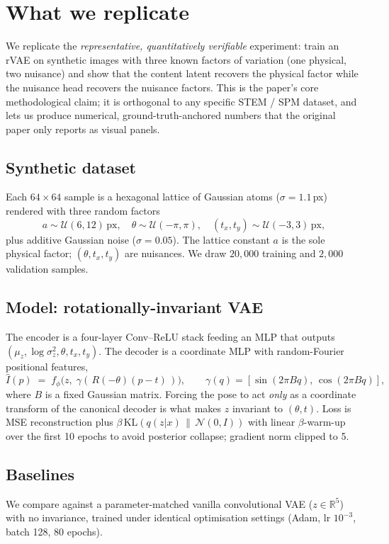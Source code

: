 \documentclass[11pt]{article}
\begin{document}
\section{What we replicate}
We replicate the \emph{representative, quantitatively verifiable}
experiment: train an rVAE on synthetic images with three known factors
of variation (one physical, two nuisance) and show that the content
latent recovers the physical factor while the nuisance head recovers the
nuisance factors. This is the paper's core methodological claim; it is
orthogonal to any specific STEM / SPM dataset, and lets us produce
numerical, ground-truth-anchored numbers that the original paper only
reports as visual panels.

\subsection{Synthetic dataset}
Each $64\times64$ sample is a hexagonal lattice of Gaussian atoms
($\sigma=1.1\,$px) rendered with three random factors
\[
  a \sim \mathcal U(6, 12)\,\text{px},\quad
  \theta \sim \mathcal U(-\pi,\pi),\quad
  (t_x, t_y) \sim \mathcal U(-3, 3)\,\text{px},
\]
plus additive Gaussian noise ($\sigma=0.05$). The lattice constant $a$
is the sole physical factor; $(\theta, t_x, t_y)$ are nuisances. We draw
$20{,}000$ training and $2{,}000$ validation samples.

\subsection{Model: rotationally-invariant VAE}
The encoder is a four-layer Conv--ReLU stack feeding an MLP that outputs
$(\mu_z, \log\sigma_z^2, \theta, t_x, t_y)$. The decoder is a coordinate
MLP with random-Fourier positional features,
\[
  \hat I(p) \;=\; f_\phi\!\bigl(z,\; \gamma(\,R(-\theta)(p - t)\,)\bigr),\qquad
  \gamma(q) = [\sin(2\pi B q),\,\cos(2\pi B q)],
\]
where $B$ is a fixed Gaussian matrix. Forcing the pose to act
\emph{only} as a coordinate transform of the canonical decoder is what
makes $z$ invariant to $(\theta, t)$. Loss is MSE reconstruction plus
$\beta\,\mathrm{KL}(q(z|x)\,\|\,\mathcal N(0,I))$ with linear
$\beta$-warm-up over the first 10 epochs to avoid posterior collapse;
gradient norm clipped to 5.

\subsection{Baselines}
We compare against a parameter-matched vanilla convolutional VAE
($z\in\mathbb{R}^5$) with no invariance, trained under identical
optimisation settings (Adam, lr $10^{-3}$, batch 128, 80 epochs).
\end{document}
